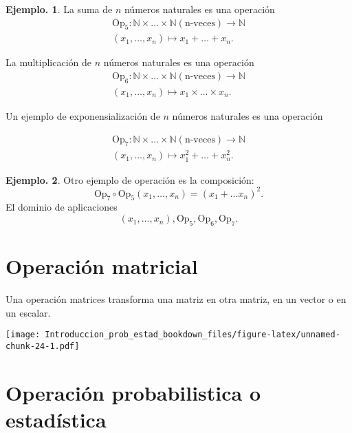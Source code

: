 \documentclass[]{book}
\theoremstyle{definition}
\theoremstyle{definition}
\newtheorem{example}{Ejemplo.}[chapter]
\theoremstyle{definition}
\theoremstyle{remark}
\begin{document}
\begin{example}
\protect\hypertarget{exm:unnamed-chunk-22}{}{\label{exm:unnamed-chunk-22} }
La suma de \(n\) números naturales es una operación
\begin{eqnarray*}
\mbox{Op}_5: \mathbb{N} \times \ldots \times \mathbb{N} ( \mbox{n-veces})  \to \mathbb{N}\\
  (x_1,\ldots,x_n) \mapsto x_1 + \ldots + x_n. 
\end{eqnarray*}

La multiplicación de \(n\) números naturales es una operación\\
\begin{eqnarray*}
\mbox{Op}_6: \mathbb{N}\times \ldots \times \mathbb{N} ( \mbox{n-veces})  \to \mathbb{N}\\
  (x_1,\ldots,x_n) \mapsto x_1 \times \ldots \times x_n.
\end{eqnarray*}

Un ejemplo de exponensialización de \(n\) números naturales es una operación

\begin{eqnarray*}
\mbox{Op}_7: \mathbb{N}\times \ldots \times \mathbb{N} ( \mbox{n-veces})  \to \mathbb{N}\\
  (x_1,\ldots,x_n) \mapsto x_1^2 + \ldots + x_n^2.
\end{eqnarray*}
\end{example}

\begin{example}
\protect\hypertarget{exm:unnamed-chunk-23}{}{\label{exm:unnamed-chunk-23} }Otro ejemplo de operación es la composición:
\[ \mbox{Op}_7 \circ \mbox{Op}_5 (x_1,\ldots, x_n)= (x_1+\ldots
                                                       x_n)^2.\]
El dominio de aplicaciones
\[(x_1,\ldots, x_n), \mbox{Op}_5, \mbox{Op}_6, \mbox{Op}_7.\]
\end{example}

\hypertarget{operaciuxf3n-matricial}{%
\section*{Operación matricial}\label{operaciuxf3n-matricial}}

Una operación matrices transforma una matriz en otra matriz, en un
vector o en un escalar.

\texttt{[image: Introduccion\_prob\_estad\_bookdown\_files/figure-latex/unnamed-chunk-24-1.pdf]}

\hypertarget{operaciuxf3n-probabilistica-o-estaduxedstica}{%
\section*{Operación probabilistica o estadística}\label{operaciuxf3n-probabilistica-o-estaduxedstica}}
\end{document}
